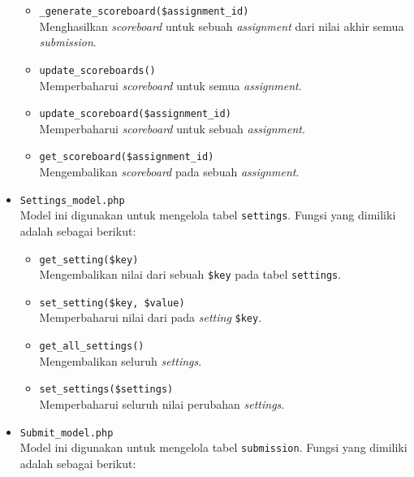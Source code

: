 \begin{itemize}
	      \begin{itemize}
		      \item \verb|_generate_scoreboard($assignment_id)| \\
		            Menghasilkan \textit{scoreboard} untuk sebuah \textit{assignment} dari nilai akhir semua \textit{submission}.
		      \item \verb|update_scoreboards()| \\
		            Memperbaharui \textit{scoreboard} untuk semua \textit{assignment}.
		      \item \verb|update_scoreboard($assignment_id)| \\
		            Memperbaharui \textit{scoreboard} untuk sebuah \textit{assignment}.
		      \item \verb|get_scoreboard($assignment_id)| \\
		            Mengembalikan \textit{scoreboard} pada sebuah \textit{assignment}.
	      \end{itemize}

	\item \verb|Settings_model.php| \\
	      Model ini digunakan untuk mengelola tabel \verb|settings|. Fungsi yang dimiliki adalah sebagai berikut:

	      \begin{itemize}
		      \item \verb|get_setting($key)| \\
		            Mengembalikan nilai dari sebuah \verb|$key| pada tabel \verb|settings|.
		      \item \verb|set_setting($key, $value)| \\
		            Memperbaharui nilai dari pada \textit{setting} \verb|$key|.
		      \item \verb|get_all_settings()| \\
		            Mengembalikan seluruh \textit{settings}.
		      \item \verb|set_settings($settings)| \\
		            Memperbaharui seluruh nilai perubahan \textit{settings}.
	      \end{itemize}

	\item \verb|Submit_model.php| \\
	      Model ini digunakan untuk mengelola tabel \verb|submission|. Fungsi yang dimiliki adalah sebagai berikut:


\end{itemize}
